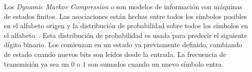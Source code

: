 
 Los \emph{Dynamic Markov Compression} o \DMC son modelos de información con máquinas de estados finitos. Las asociaciones están hechas entre todos los símbolos posibles en el alfabeto origen y la distribución de probabilidad sobre todos los símbolos en el alfabeto~\cite{PenaSordo2015}. 
 Esta distribución de probabilidad es usada para predecir el siguiente dígito binario. Los \DMC comienzan en un estado ya previamente definido, cambiando de estado cuando nuevos bits son leídos desde la entrada. La frecuencia de transmisión ya sea un $0$ o $1$ son sumados cuando un nuevo símbolo entra. %



